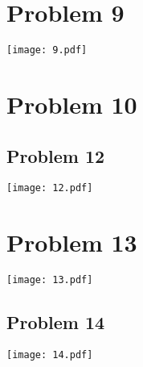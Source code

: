 \documentclass[a4paper, 8]{article}
\begin{document}
\section*{Problem 9}


\texttt{[image: 9.pdf]}

\section*{Problem 10}



\begin{samepage}
\section*{Problem 12}


\texttt{[image: 12.pdf]}
\end{samepage}

\section*{Problem 13}


\texttt{[image: 13.pdf]}

\begin{samepage}
\section*{Problem 14}


\texttt{[image: 14.pdf]}
\end{samepage}
\end{document}
